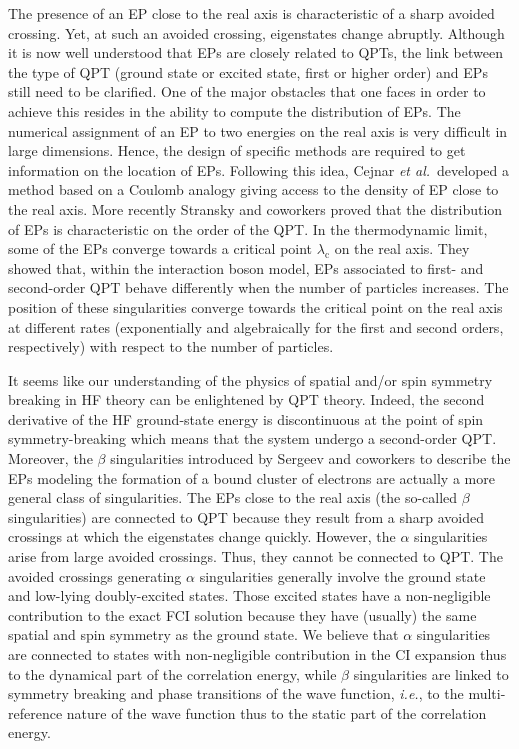 \documentclass[aps,prb,reprint,noshowkeys,superscriptaddress]{revtex4-1}
\newcommand{\ie}{\textit{i.e.}}
\begin{document}
The presence of an EP close to the real axis is characteristic of a sharp avoided crossing. Yet, at such an avoided crossing, eigenstates change abruptly. Although it is now well understood that EPs are closely related to QPTs, the link between the type of QPT (ground state or excited state, first or higher order) and EPs still need to be clarified. One of the major obstacles that one faces in order to achieve this resides in the ability to compute the distribution of EPs. The numerical assignment of an EP to two energies on the real axis is very difficult in large dimensions. Hence, the design of specific methods are required to get information on the location of EPs. Following this idea, Cejnar \textit{et al.}~developed a method based on a Coulomb analogy giving access to the density of EP close to the real axis. \cite{Cejnar_2005, Cejnar_2007} More recently Stransky and coworkers proved that the distribution of EPs is characteristic on the order of the QPT. \cite{Stransky_2018} In the thermodynamic limit, some of the EPs converge towards a critical point $\lambda_\text{c}$ on the real axis. They showed that, within the interaction boson model, \cite{Lipkin_1965} EPs associated to first- and second-order QPT behave differently when the number of particles increases. The position of these singularities converge towards the critical point on the real axis at different rates (exponentially and algebraically for the first and second orders, respectively) with respect to the number of particles.

It seems like our understanding of the physics of spatial and/or spin symmetry breaking in HF theory can be enlightened by QPT theory. Indeed, the second derivative of the HF ground-state energy is discontinuous at the point of spin symmetry-breaking which means that the system undergo a second-order QPT. Moreover, the $\beta$ singularities introduced by Sergeev and coworkers to describe the EPs modeling the formation of a bound cluster of electrons are actually a more general class of singularities. The EPs close to the real axis (the so-called $\beta$ singularities) are connected to QPT because they result from a sharp avoided crossings at which the eigenstates change quickly. However, the $\alpha$ singularities arise from large avoided crossings. Thus, they cannot be connected to QPT. The avoided crossings generating $\alpha$ singularities generally involve the ground state and low-lying doubly-excited states. Those excited states have a non-negligible contribution to the exact FCI solution because they have (usually) the same spatial and spin symmetry as the ground state. We believe that $\alpha$ singularities are connected to states with non-negligible contribution in the CI expansion thus to the dynamical part of the correlation energy, while $\beta$ singularities are linked to symmetry breaking and phase transitions of the wave function, \ie, to the multi-reference nature of the wave function thus to the static part of the correlation energy.
\end{document}

